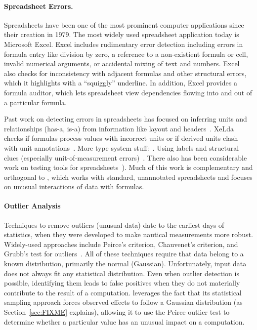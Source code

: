 \paragraph{Spreadsheet Errors.}
Spreadsheets have been one of the most prominent computer applications
since their creation in 1979.
 The most widely used spreadsheet application today is Microsoft
Excel. Excel includes rudimentary error detection including errors in
formula entry like division by zero, a reference to a non-existient
formula or cell, invalid numerical arguments, or accidental mixing of
text and numbers.
Excel also checks for inconsistency with adjacent formulas and other
structural errors, which it highlights with a ``squiggly'' underline. In addition, Excel provides a formula auditor, which lets spreadsheet view dependencies flowing into and out of a particular formula.

Past work on detecting errors in spreadsheets has focused on inferring
units and relationships (has-a, is-a) from information like layout and
headers~\cite{DBLP:conf/kbse/AhmadAGK03}. XeLda checks if formulas
process values with incorrect units or if derived units clash with
unit annotations~\cite{Antoniu:2004:VUC:998675.999448}.  More type
system stuff:~\cite{Erwig:2005:AGM:1062455.1062494}. Using labels and
structural clues (especially unit-of-measurement
errors)~\cite{Chambers:2010:RSL:1860134.1860346}. There also has been
considerable work on testing tools for
spreadsheets~\cite{fisher2006scaling,rothermel1998you,rothermel2001methodology,Carver:2006:EET:1159733.1159775}). Much
of this work is complementary and orthogonal to \checkcell{}, which
works with standard, unannotated spreadsheets and focuses on unusual
interactions of data with formulas.



\paragraph{Outlier Analysis}

Techniques to remove outliers (unusual data) date to the earliest days
of statistics, when they were developed to make nautical measurements
more robust. Widely-used approaches include Peirce's criterion,
Chauvenet's criterion, and Grubb's test for outliers~\cite{barnett1994outliers}. All
of these techniques require that data belong to a known distribution,
primarily the normal (Gaussian). Unfortunately, input data does not
always fit any statistical distribution. Even when outlier detection is
possible, identifying them leads to false positives when they do not
materially contribute to the result of a computation.
\checkcell{} leverages the
fact that its statistical sampling approach forces observed effects to
follow a Gaussian distribution (as Section~\ref{sec:FIXME} explains),
allowing it to use the Peirce outlier test to determine whether a
particular value has an unusual impact on a computation.

